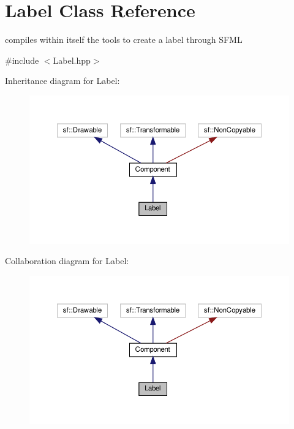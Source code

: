 \hypertarget{classLabel}{}\section{Label Class Reference}
\label{classLabel}


compiles within itself the tools to create a label through S\+F\+ML  




{\ttfamily \#include $<$Label.\+hpp$>$}



Inheritance diagram for Label\+:
\nopagebreak
\begin{figure}[H]
\begin{center}
\leavevmode
\includegraphics[width=350pt]{classLabel__inherit__graph}
\end{center}
\end{figure}


Collaboration diagram for Label\+:
\nopagebreak
\begin{figure}[H]
\begin{center}
\leavevmode
\includegraphics[width=350pt]{classLabel__coll__graph}
\end{center}
\end{figure}
